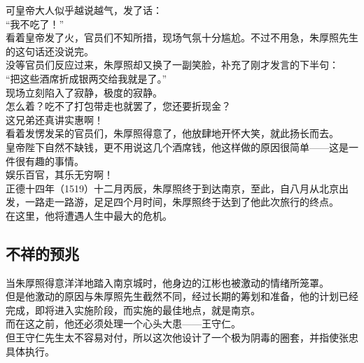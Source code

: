 \begin{multicols}{\theparacolNo}
可皇帝大人似乎越说越气，发了话：\\

“我不吃了！”\\

看着皇帝发了火，官员们不知所措，现场气氛十分尴尬。不过不用急，朱厚照先生的这句话还没说完。\\

没等官员们反应过来，朱厚照却又换了一副笑脸，补充了刚才发言的下半句：\\

“把这些酒席折成银两交给我就是了。”\\

现场立刻陷入了寂静，极度的寂静。\\

怎么着？吃不了打包带走也就罢了，您还要折现金？\\

这兄弟还真讲实惠啊！\\

看着发愣发呆的官员们，朱厚照得意了，他放肆地开怀大笑，就此扬长而去。\\

皇帝陛下自然不缺钱，更不用说这几个酒席钱，他这样做的原因很简单——这是一件很有趣的事情。\\

娱乐百官，其乐无穷啊！\\

正德十四年（1519）十二月丙辰，朱厚照终于到达南京，至此，自八月从北京出发，一路走一路游，足足四个月时间，朱厚照终于达到了他此次旅行的终点。\\

在这里，他将遭遇人生中最大的危机。\\

\subsection{不祥的预兆}
当朱厚照得意洋洋地踏入南京城时，他身边的江彬也被激动的情绪所笼罩。\\

但是他激动的原因与朱厚照先生截然不同，经过长期的筹划和准备，他的计划已经完成，即将进入实施阶段，而实施的最佳地点，就是南京。\\

而在这之前，他还必须处理一个心头大患——王守仁。\\

但王守仁先生太不容易对付，所以这次他设计了一个极为阴毒的圈套，并指使张忠具体执行。\\


\end{multicols}
